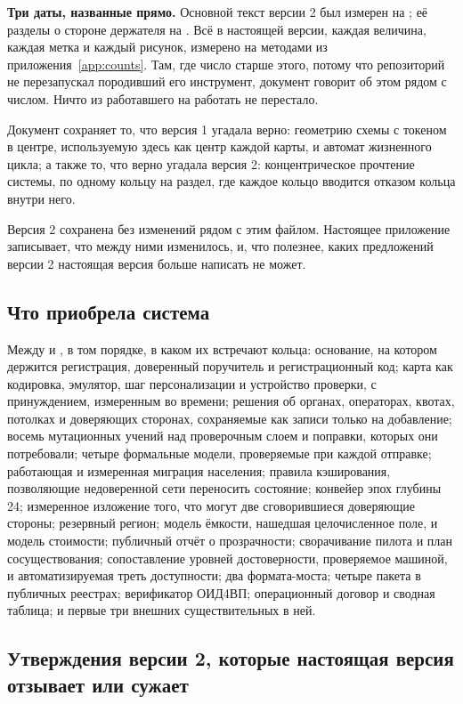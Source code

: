 \textbf{Три даты, названные прямо.} Основной текст версии 2 был измерен на ; её
разделы о стороне держателя на . Всё в настоящей версии, каждая величина, каждая
метка и каждый рисунок, измерено на  методами из приложения~\ref{app:counts}.
Там, где число старше этого, потому что репозиторий не перезапускал породивший его инструмент,
документ говорит об этом рядом с числом. Ничто из работавшего на  работать не
перестало.

Документ сохраняет то, что версия 1 угадала верно: геометрию схемы с токеном в центре,
используемую здесь как центр каждой карты, и автомат жизненного цикла; а также то, что верно
угадала версия 2: концентрическое прочтение системы, по одному кольцу на раздел, где каждое
кольцо вводится отказом кольца внутри него.

Версия 2 сохранена без изменений рядом с этим файлом. Настоящее приложение записывает, что между
ними изменилось, и, что полезнее, каких предложений версии 2 настоящая версия больше написать не
может.

\subsection*{Что приобрела система}

Между  и , в том порядке, в каком их встречают кольца: основание,
на котором держится регистрация, доверенный поручитель и регистрационный код; карта как
кодировка, эмулятор, шаг персонализации и устройство проверки, с принуждением, измеренным во
времени; решения об органах, операторах, квотах, потолках и доверяющих сторонах, сохраняемые как
записи только на добавление; восемь мутационных учений над проверочным слоем и поправки, которых
они потребовали; четыре формальные модели, проверяемые при каждой отправке; работающая и
измеренная миграция населения; правила кэширования, позволяющие недоверенной сети переносить
состояние; конвейер эпох глубины 24; измеренное изложение того, что могут две сговорившиеся
доверяющие стороны; резервный регион; модель ёмкости, нашедшая целочисленное поле, и модель
стоимости; публичный отчёт о прозрачности; сворачивание пилота и план сосуществования;
сопоставление уровней достоверности, проверяемое машиной, и автоматизируемая треть доступности;
два формата-моста; четыре пакета в публичных реестрах; верификатор ОИД4ВП; операционный договор и
сводная таблица; и первые три внешних существительных в ней.

\subsection*{Утверждения версии 2, которые настоящая версия отзывает или сужает}

